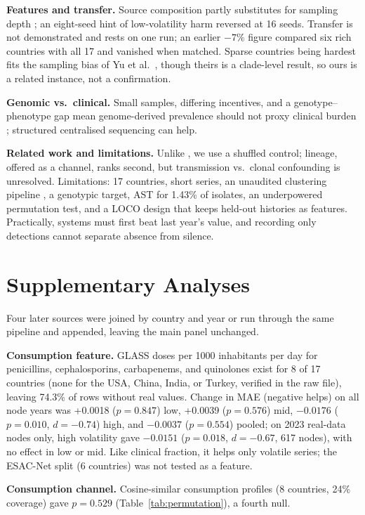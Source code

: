 \documentclass[journal]{IEEEtran}
\begin{document}
\textbf{Features and transfer.} Source composition partly substitutes for sampling depth \cite{ref1, ref2}; an eight-seed hint of low-volatility harm reversed at 16 seeds. Transfer is not demonstrated and rests on one run; an earlier $-7\%$ figure compared six rich countries with all 17 and vanished when matched. Sparse countries being hardest fits the sampling bias of Yu et al.\ \cite{ref24}, though theirs is a clade-level result, so ours is a related instance, not a confirmation.

\textbf{Genomic vs.\ clinical.} Small samples, differing incentives, and a genotype--phenotype gap \cite{ref7} mean genome-derived prevalence should not proxy clinical burden \cite{ref6, ref24}; structured centralised sequencing \cite{ref5} can help.

\textbf{Related work and limitations.} Unlike \cite{ref17, ref18, ref19, ref23}, we use a shuffled control; lineage, offered as a channel, ranks second, but transmission vs.\ clonal confounding is unresolved. Limitations: 17 countries, short series, an unaudited clustering pipeline \cite{ref8}, a genotypic target, AST for 1.43\% of isolates, an underpowered permutation test, and a LOCO design that keeps held-out histories as features. Practically, systems must first beat last year's value, and recording only detections cannot separate absence from silence.

\section{Supplementary Analyses}\label{sec:supp}
Four later sources were joined by country and year or run through the same pipeline and appended, leaving the main panel unchanged.

\textbf{Consumption feature.} GLASS doses per 1000 inhabitants per day for penicillins, cephalosporins, carbapenems, and quinolones exist for 8 of 17 countries (none for the USA, China, India, or Turkey, verified in the raw file), leaving 74.3\% of rows without real values. Change in MAE (negative helps) on all node years was +0.0018 ($p=0.847$) low, +0.0039 ($p=0.576$) mid, $-0.0176$ ($p=0.010$, $d=-0.74$) high, and $-0.0037$ ($p=0.554$) pooled; on 2023 real-data nodes only, high volatility gave $-0.0151$ ($p=0.018$, $d=-0.67$, 617 nodes), with no effect in low or mid. Like clinical fraction, it helps only volatile series; the ESAC-Net split (6 countries) was not tested as a feature.

\textbf{Consumption channel.} Cosine-similar consumption profiles (8 countries, 24\% coverage) gave $p=0.529$ (Table~\ref{tab:permutation}), a fourth null.
\end{document}
